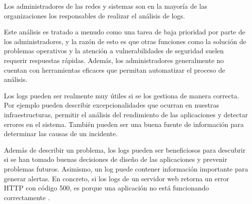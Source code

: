 Los administradores de las redes y sistemas son en la mayoría de las organizaciones los responsables de realizar el análisis de logs.

Este análisis es tratado a menudo como una tarea de baja prioridad por parte de los administradores, y la razón de esto es que otras funciones como la solución de problemas operativos y la atención a vulnerabilidades de seguridad suelen requerir respuestas rápidas. Además, los administradores generalmente no cuentan con herramientas eficaces que permitan automatizar el proceso de análisis.

Los logs pueden ser realmente muy útiles si se los gestiona de manera correcta. Por ejemplo pueden describir excepcionalidades que ocurran en nuestras infraestructuras, permitir el análisis del rendimiento de las aplicaciones y detectar errores en el sistema. También pueden ser una buena fuente de información para determinar las causas de un incidente.

Además de describir un problema, los logs pueden ser beneficiosos para descubrir si se han tomado buenas decisiones de diseño de las aplicaciones y prevenir problemas futuros. Asimismo, un log puede contener información importante para generar alertas. En concreto, si los logs de un servidor web retorna un error HTTP con código 500, es porque una aplicación no está funcionando correctamente \cite[p.~30-31]{monitoreo:logging_and_log_management}.

